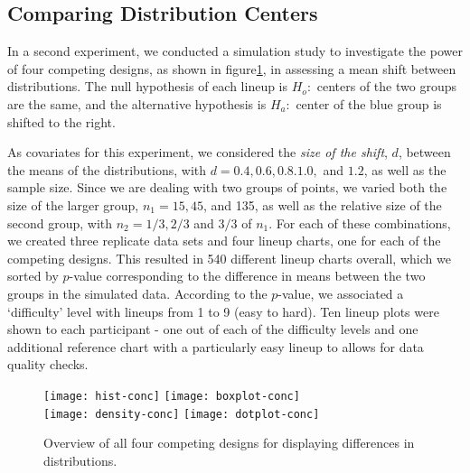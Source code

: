 
\subsection{Comparing Distribution Centers}

In a second experiment, we conducted a simulation study to investigate the power of four competing designs, as shown in figure\ref{fig:expii}, in assessing a mean shift between distributions. The null hypothesis of each lineup is $H_o:$ centers of the two groups are the same, and the alternative hypothesis is $H_a:$ center of the blue group is shifted to the right.

As covariates for this experiment, we considered the {\it size of the shift}, $d$, between the means of the distributions, with $d=0.4, 0.6, 0.8. 1.0,$ and $1.2$, as well as the sample size.  Since we are dealing with two groups of points, we varied both the size of the larger group, $n_1 = 15, 45$, and 135, as well as the relative size of the second group, with $n_2 = 1/3, 2/3$ and $3/3$ of $n_1$. For each of these combinations, we created three replicate data sets and four lineup charts, one for each of the competing designs. This resulted in 540 different lineup charts overall, which we sorted by $p$-value corresponding to the difference in means between the two groups in the simulated data. According to the $p$-value, we associated a `difficulty' level with lineups from 1 to 9 (easy to hard). Ten lineup plots were shown to each participant - one out of each of the difficulty levels and one additional reference chart with a particularly easy lineup  to allows for data quality checks.
\begin{figure} [hbtp]
   \centering
   \texttt{[image: hist-conc]} 
   \texttt{[image: boxplot-conc]} \\
   \texttt{[image: density-conc]} 
   \texttt{[image: dotplot-conc]} 
   \caption{Overview of all four competing designs for displaying differences in distributions.}
   \label{fig:expii}
\end{figure}
